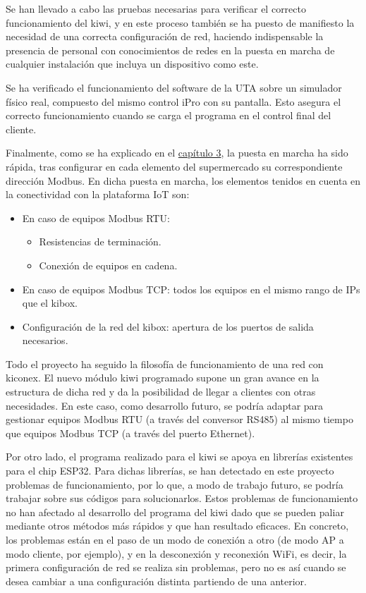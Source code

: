
Se han llevado a cabo las pruebas necesarias para verificar el correcto funcionamiento del kiwi, y en este proceso también se ha puesto de manifiesto la necesidad de una correcta configuración de red, haciendo indispensable la presencia de personal con conocimientos de redes en la puesta en marcha de cualquier instalación que incluya un dispositivo como este.

Se ha verificado el funcionamiento del software de la UTA sobre un simulador físico real, compuesto del mismo control iPro con su pantalla. Esto asegura el correcto funcionamiento cuando se carga el programa en el control final del cliente.

Finalmente, como se ha explicado en el \hyperref[sec:altaInstalacion]{capítulo 3}, la puesta en marcha ha sido rápida, tras configurar en cada elemento del supermercado su correspondiente dirección Modbus. En dicha puesta en marcha, los elementos tenidos en cuenta en la conectividad con la plataforma IoT son:

\begin{itemize}
    \item En caso de equipos Modbus RTU: 
    \begin{itemize}
        \item Resistencias de terminación.
        \item Conexión de equipos en cadena.
    \end{itemize}
    \item En caso de equipos Modbus TCP: todos los equipos en el mismo rango de IPs que el kibox.
    \item Configuración de la red del kibox: apertura de los puertos de salida necesarios.
\end{itemize}

Todo el proyecto ha seguido la filosofía de funcionamiento de una red con kiconex. El nuevo módulo kiwi programado supone un gran avance en la estructura de dicha red y da la posibilidad de llegar a clientes con otras necesidades. En este caso, como desarrollo futuro, se podría adaptar para gestionar equipos Modbus RTU (a través del conversor RS485) al mismo tiempo que equipos Modbus TCP (a través del puerto Ethernet).

Por otro lado, el programa realizado para el kiwi se apoya en librerías existentes para el chip ESP32. Para dichas librerías, se han detectado en este proyecto problemas de funcionamiento, por lo que, a modo de trabajo futuro, se podría trabajar sobre sus códigos para solucionarlos. Estos problemas de funcionamiento no han afectado al desarrollo del programa del kiwi dado que se pueden paliar mediante otros métodos más rápidos y que han resultado eficaces. En concreto, los problemas están en el paso de un modo de conexión a otro (de modo AP a modo cliente, por ejemplo), y en la desconexión y reconexión WiFi, es decir, la primera configuración de red se realiza sin problemas, pero no es así cuando se desea cambiar a una configuración distinta partiendo de una anterior.


